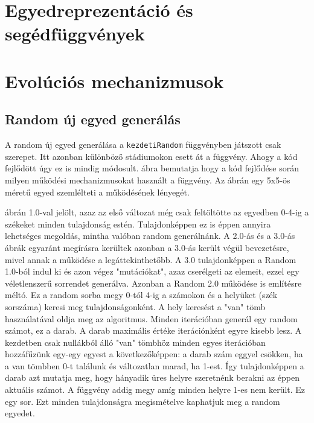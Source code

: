 \documentclass[12ppt,a4paper,oneside]{report}
\begin{document}
    \section{Egyedreprezentáció és segédfüggvények} %

    \section{Evolúciós mechanizmusok} %
        
        \subsection{Random új egyed generálás} %
        
         {A random új egyed generálása a \texttt{kezdetiRandom} függvényben játszott csak szerepet. Itt azonban különböző stádiumokon esett át a függvény. Ahogy a kód fejlődött úgy ez is mindig módosult.  ábra bemutatja hogy a kód fejlődése során milyen működési mechanizmusokat használt a függvény. Az ábrán egy 5x5-ös méretű egyed szemlélteti a működésének lényegét.}
         
           
         { ábrán 1.0-val jelölt, azaz az első változat még csak feltöltötte az egyedben 0-4-ig a székeket minden tulajdonság estén. Tulajdonképpen ez is éppen annyira lehetséges megoldás, mintha valóban random generálnánk. A 2.0-ás és a 3.0-ás ábrák egyaránt megírásra kerültek azonban a 3.0-ás került végül bevezetésre, mivel annak a működése a legáttekinthetőbb. A 3.0 tulajdonképpen a Random 1.0-ból indul ki és azon végez "mutációkat", azaz cserélgeti az elemeit, ezzel egy véletlenszerű sorrendet generálva. Azonban a Random 2.0 működése is említésre méltó. Ez a random sorba megy 0-tól 4-ig a számokon és a helyüket (szék sorszáma) keresi meg tulajdonságonként. A hely keresést a "van" tömb használatával oldja meg az algoritmus. Minden iterációban generál egy random számot, ez a darab. A darab maximális értéke iterációnként egyre kisebb lesz. A kezdetben csak nullákból álló "van" tömbhöz minden egyes iterációban hozzáfűzünk egy-egy egyest a következőképpen: a darab szám eggyel csökken, ha a van tömbben 0-t találunk és változatlan marad, ha 1-est. Így tulajdonképpen a darab azt mutatja meg, hogy hányadik üres helyre szeretnénk berakni az éppen aktuális számot. A függvény addig megy amíg minden helyre 1-es nem került. Ez egy sor. Ezt minden tulajdonságra megismételve kaphatjuk meg a random egyedet.}
            
\end{document}
